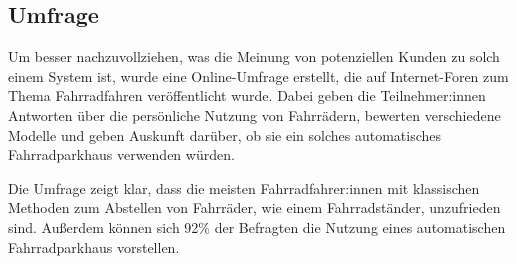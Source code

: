 \subsection{Umfrage}
Um besser nachzuvollziehen, was die Meinung von potenziellen Kunden zu solch einem System ist, wurde eine Online-Umfrage erstellt, die auf Internet-Foren zum Thema Fahrradfahren veröffentlicht wurde. Dabei geben die Teilnehmer:innen Antworten über die persönliche Nutzung von Fahrrädern, bewerten verschiedene Modelle und geben Auskunft darüber, ob sie ein solches automatisches Fahrradparkhaus verwenden würden.

\smallskip \noindent Die Umfrage zeigt klar, dass die meisten Fahrradfahrer:innen mit klassischen Methoden zum Abstellen von Fahrräder, wie einem Fahrradständer, unzufrieden sind. Außerdem können sich 92\% der Befragten die Nutzung eines automatischen Fahrradparkhaus vorstellen.
